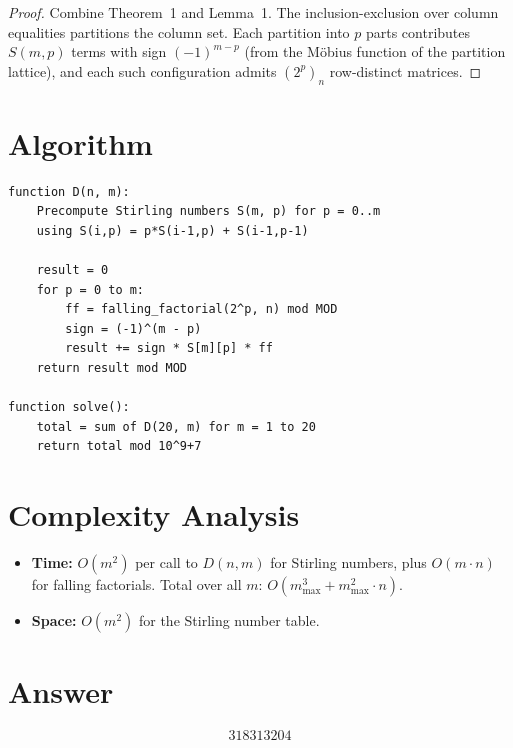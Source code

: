 \documentclass[11pt]{article}
\begin{document}
\begin{proof}
Combine Theorem~1 and Lemma~1. The inclusion-exclusion over column equalities partitions the column set. Each partition into $p$ parts contributes $S(m,p)$ terms with sign $(-1)^{m-p}$ (from the M\"obius function of the partition lattice), and each such configuration admits $(2^p)_n$ row-distinct matrices.
\end{proof}

\section{Algorithm}

\begin{verbatim}
function D(n, m):
    Precompute Stirling numbers S(m, p) for p = 0..m
    using S(i,p) = p*S(i-1,p) + S(i-1,p-1)

    result = 0
    for p = 0 to m:
        ff = falling_factorial(2^p, n) mod MOD
        sign = (-1)^(m - p)
        result += sign * S[m][p] * ff
    return result mod MOD

function solve():
    total = sum of D(20, m) for m = 1 to 20
    return total mod 10^9+7
\end{verbatim}

\section{Complexity Analysis}

\begin{itemize}
    \item \textbf{Time:} $O(m^2)$ per call to $D(n,m)$ for Stirling numbers, plus $O(m \cdot n)$ for falling factorials. Total over all $m$: $O(m_{\max}^3 + m_{\max}^2 \cdot n)$.
    \item \textbf{Space:} $O(m^2)$ for the Stirling number table.
\end{itemize}

\section{Answer}

\[
\boxed{318313204}
\]
\end{document}
